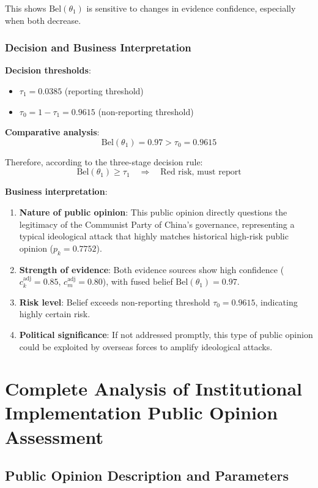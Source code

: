 \documentclass[11pt,a4paper]{report}
\begin{document}
This shows $\mathrm{Bel}(\theta_1)$ is sensitive to changes in evidence confidence, especially when both decrease.

\subsubsection{Decision and Business Interpretation}

\textbf{Decision thresholds}:
\begin{itemize}
    \item $\tau_1 = 0.0385$ (reporting threshold)
    \item $\tau_0 = 1 - \tau_1 = 0.9615$ (non-reporting threshold)
\end{itemize}

\textbf{Comparative analysis}:
\[
\mathrm{Bel}(\theta_1) = 0.97 > \tau_0 = 0.9615
\]

Therefore, according to the three-stage decision rule:
\[
\mathrm{Bel}(\theta_1) \geq \tau_1 \quad \Rightarrow \quad \text{Red risk, must report}
\]

\textbf{Business interpretation}:
\begin{enumerate}
    \item \textbf{Nature of public opinion}: This public opinion directly questions the legitimacy of the Communist Party of China's governance, representing a typical ideological attack that highly matches historical high-risk public opinion ($p_k = 0.7752$).
    \item \textbf{Strength of evidence}: Both evidence sources show high confidence ($c_k^{\text{adj}} = 0.85$, $c_m^{\text{adj}} = 0.80$), with fused belief $\mathrm{Bel}(\theta_1) = 0.97$.
    \item \textbf{Risk level}: Belief exceeds non-reporting threshold $\tau_0 = 0.9615$, indicating highly certain risk.
    \item \textbf{Political significance}: If not addressed promptly, this type of public opinion could be exploited by overseas forces to amplify ideological attacks.
\end{enumerate}

\section{Complete Analysis of Institutional Implementation Public Opinion Assessment}

\subsection{Public Opinion Description and Parameters}
\end{document}
